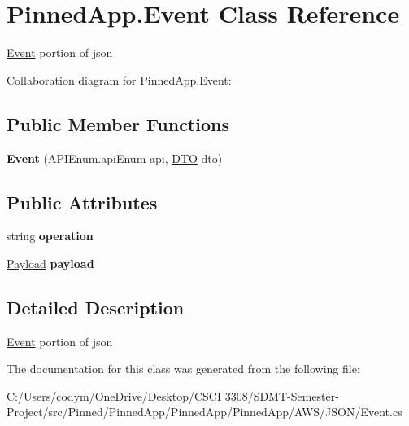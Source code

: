 \hypertarget{class_pinned_app_1_1_event}{}\section{Pinned\+App.\+Event Class Reference}
\label{class_pinned_app_1_1_event}


\hyperlink{class_pinned_app_1_1_event}{Event} portion of json  




Collaboration diagram for Pinned\+App.\+Event\+:
\subsection*{Public Member Functions}
\begin{DoxyCompactItemize}
\item 
\mbox{\label{class_pinned_app_1_1_event_a2704255cd09f9b094d15be45470e1dbe}} 
{\bfseries Event} (A\+P\+I\+Enum.\+api\+Enum api, \hyperlink{class_pinned_app_1_1_d_t_o}{D\+TO} dto)
\end{DoxyCompactItemize}
\subsection*{Public Attributes}
\begin{DoxyCompactItemize}
\item 
\mbox{\label{class_pinned_app_1_1_event_a2781147c2dadaf68ce8fcd1c7c4bbe84}} 
string {\bfseries operation}
\item 
\mbox{\label{class_pinned_app_1_1_event_a117a5b4efec6a57f4596c0f4f642f055}} 
\hyperlink{class_pinned_app_1_1_payload}{Payload} {\bfseries payload}
\end{DoxyCompactItemize}


\subsection{Detailed Description}
\hyperlink{class_pinned_app_1_1_event}{Event} portion of json 



The documentation for this class was generated from the following file\+:\begin{DoxyCompactItemize}
\item 
C\+:/\+Users/codym/\+One\+Drive/\+Desktop/\+C\+S\+C\+I 3308/\+S\+D\+M\+T-\/\+Semester-\/\+Project/src/\+Pinned/\+Pinned\+App/\+Pinned\+App/\+Pinned\+App/\+A\+W\+S/\+J\+S\+O\+N/Event.\+cs\end{DoxyCompactItemize}
